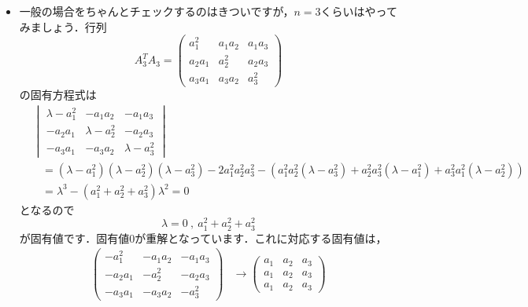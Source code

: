 \documentclass[a4paper,pdflatex,ja=standard]{bxjsarticle}
\begin{document}
\begin{itemize}
  \item 
  一般の場合をちゃんとチェックするのはきついですが，$n=3$くらいはやってみましょう．行列
  \begin{equation}
    A_{3}^{T}A_{3}
    =
    \begin{pmatrix}
      a_{1}^{2} & a_{1}a_{2} & a_{1}a_{3} \\
      a_{2}a_{1} & a_{2}^{2} & a_{2}a_{3} \\
      a_{3}a_{1} & a_{3}a_{2} & a_{3}^{2}
    \end{pmatrix}
  \end{equation}
  の固有方程式は
  \begin{align}
    &
    \begin{vmatrix}
      \lambda-a_{1}^{2} & -a_{1}a_{2} & -a_{1}a_{3} \\
      -a_{2}a_{1} & \lambda-a_{2}^{2} & -a_{2}a_{3} \\
      -a_{3}a_{1} & -a_{3}a_{2} & \lambda-a_{3}^{2}
    \end{vmatrix}
    \nonumber
    \\
    &\hspace{10pt}
    =
    (\lambda-a_{1}^{2})(\lambda-a_{2}^{2})(\lambda-a_{3}^{2})
    -
    2a_{1}^{2}a_{2}^{2}a_{3}^{2}
    -
    \left(  
      a_{1}^{2}a_{2}^{2}(\lambda-a_{3}^2)
      +
      a_{2}^{2}a_{3}^{2}(\lambda-a_{1}^2)
      +
      a_{3}^{2}a_{1}^{2}(\lambda-a_{2}^2)
    \right)
    \nonumber
    \\
    &\hspace{10pt}
    =
    \lambda^3
    -
    (a_{1}^2+a_{2}^2+a_{3}^2)\lambda^2
    =
    0
  \end{align}
  となるので
  \begin{equation}
    \lambda
    =
    0 \ ,\ a_{1}^2+a_{2}^2+a_{3}^2
  \end{equation}
  が固有値です．固有値$0$が重解となっています．これに対応する固有値は，
  \begin{align}
    \begin{pmatrix}
      -a_{1}^{2} & -a_{1}a_{2} & -a_{1}a_{3} \\
      -a_{2}a_{1} & -a_{2}^{2} & -a_{2}a_{3} \\
      -a_{3}a_{1} & -a_{3}a_{2} & -a_{3}^{2}
    \end{pmatrix}
    &\rightarrow
    \begin{pmatrix}
      a_{1} & a_{2} & a_{3} \\
      a_{1} & a_{2} & a_{3} \\
      a_{1} & a_{2} & a_{3}
    \end{pmatrix}

\end{align}
\end{itemize}
\end{document}
